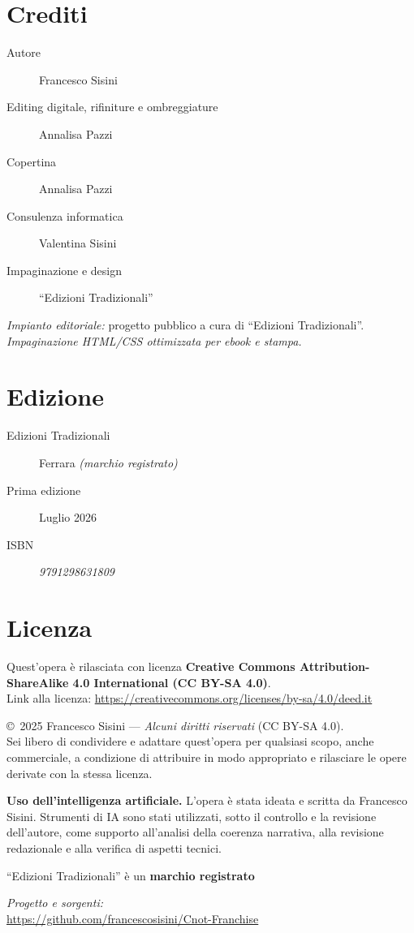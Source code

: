 \cleardoublepage
{}

\begin{flushleft}
\section*{Crediti}
\begin{description}
  \item[Autore] Francesco Sisini
  \item[Editing digitale, rifiniture e ombreggiature] Annalisa Pazzi
  \item[Copertina] Annalisa Pazzi
  \item[Consulenza informatica] Valentina Sisini
  \item[Impaginazione e design]  ``Edizioni Tradizionali''
\end{description}

\medskip
\noindent\textit{Impianto editoriale:} progetto pubblico a cura di ``Edizioni Tradizionali''.\\
\noindent\textit{Impaginazione HTML/CSS ottimizzata per ebook e stampa.}

\bigskip
\section*{Edizione}
\begin{description}
  \item[Edizioni Tradizionali] Ferrara \textit{(marchio registrato)}
  \item[Prima edizione] Luglio 2026
  \item[ISBN] \textit{9791298631809}
\end{description}

\bigskip
\section*{Licenza}
\noindent Quest’opera \`e rilasciata con licenza \textbf{Creative Commons Attribution-ShareAlike 4.0 International (CC BY-SA 4.0)}.\\
Link alla licenza: \url{https://creativecommons.org/licenses/by-sa/4.0/deed.it}

\medskip
\noindent \copyright\ 2025 Francesco Sisini —
\textit{Alcuni diritti riservati} (CC BY-SA 4.0).\\
Sei libero di condividere e adattare quest’opera per qualsiasi scopo, anche commerciale, a condizione di attribuire in modo appropriato e rilasciare le opere derivate con la stessa licenza.

\medskip

{\footnotesize
\noindent\textbf{Uso dell’intelligenza artificiale.}
L’opera \`e stata ideata e scritta da Francesco Sisini. Strumenti di IA sono
stati utilizzati, sotto il controllo e la revisione dell’autore, come supporto
all’analisi della coerenza narrativa, alla revisione redazionale e alla
verifica di aspetti tecnici.
\par}

\medskip
\noindent ``Edizioni Tradizionali'' \`e un \textbf{marchio registrato}
\end{flushleft}

\medskip
\noindent\textit{Progetto e sorgenti:}\\
\url{https://github.com/francescosisini/Cnot-Franchise}
